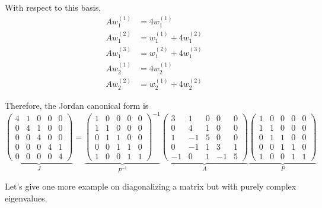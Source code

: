 \begin{example}
		With respect to this basis,
		\begin{align}
			Aw_1^{(1)} &= 4w_1^{(1)} \\
			Aw_1^{(2)} &= w_1^{(1)} + 4w_1^{(2)} \\
			Aw_1^{(3)} &= w_1^{(2)} + 4w_1^{(3)} \\
			Aw_2^{(1)} &= 4w_2^{(1)} \\
			Aw_2^{(2)} &= w_2^{(1)} + 4w_2^{(2)}
		\end{align}

		Therefore, the Jordan canonical form is
		\begin{equation}
			\underbrace{\begin{pmatrix}
				4 & 1 & 0 & 0 & 0 \\
				0 & 4 & 1 & 0 & 0 \\
				0 & 0 & 4 & 0 & 0 \\
				0 & 0 & 0 & 4 & 1 \\
				0 & 0 & 0 & 0 & 4
			\end{pmatrix}}_{J}
			=
			\underbrace{\begin{pmatrix}
				1 & 0 & 0 & 0 & 0 \\
				1 & 1 & 0 & 0 & 0 \\
				0 & 1 & 1 & 0 & 0 \\
				0 & 0 & 1 & 1 & 0 \\
				1 & 0 & 0 & 1 & 1
			\end{pmatrix}^{-1}}_{P^{-1}}
			\underbrace{\begin{pmatrix}
				3 & 1 & 0 & 0 & 0 \\
				0 & 4 & 1 & 0 & 0 \\
				1 & -1 & 5 & 0 & 0 \\
				0 & -1 & 1 & 3 & 1 \\
				-1 & 0 & 1 & -1 & 5
			\end{pmatrix}}_{A}
			\underbrace{\begin{pmatrix}
				1 & 0 & 0 & 0 & 0 \\
				1 & 1 & 0 & 0 & 0 \\
				0 & 1 & 1 & 0 & 0 \\
				0 & 0 & 1 & 1 & 0 \\
				1 & 0 & 0 & 1 & 1
			\end{pmatrix}}_{P}
		\end{equation}
	\end{example}

	Let's give one more example on diagonalizing a matrix but with purely complex eigenvalues. 

